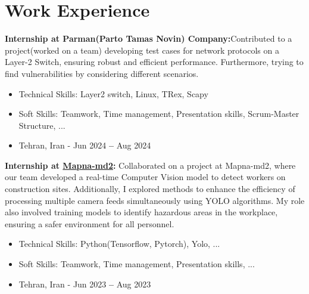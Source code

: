 \documentclass[letterpaper,11pt]{article}
\newcommand{\resumeSubHeadingListStart}{\begin{itemize}[leftmargin=0.15in, label={}]}
\newcommand{\resumeSubHeadingListEnd}{\end{itemize}}
\newcommand{\resumeItemListEnd}{\end{itemize}\vspace{-5pt}}
\begin{document}
	\section{Work Experience}
	\vspace{3pt}
	\resumeSubHeadingListStart
	\small{\item{

            \textbf{Internship at Parman(Parto Tamas Novin) Company:}{Contributed to a project(worked on a team) developing test cases for network protocols on a Layer-2 Switch, ensuring robust and efficient performance. Furthermore, trying to find vulnerabilities by considering different scenarios.}

            \begin{itemize}
                \item Technical Skills: Layer2 switch, Linux, TRex, Scapy
                \item Soft Skills: Teamwork, Time management, Presentation skills, Scrum-Master Structure, ...
                \item Tehran, Iran - Jun 2024 \textbf{--} Aug 2024
            \end{itemize}
            
		\textbf{Internship at {\href{https://www.mapnamd2.com/en/}{Mapna-md2}}: }{
            Collaborated on a project at Mapna-md2, where our team developed a real-time Computer Vision model to detect workers on construction sites. Additionally, I explored methods to enhance the efficiency of processing multiple camera feeds simultaneously using YOLO algorithms. My role also involved training models to identify hazardous areas in the workplace, ensuring a safer environment for all personnel.}
            \begin{itemize}
                \item Technical Skills: Python(Tensorflow, Pytorch), Yolo, ...
                \item Soft Skills: Teamwork, Time management, Presentation skills, ...
                \item Tehran, Iran - Jun 2023 \textbf{--} Aug 2023
            \end{itemize}



            

	}}
	\resumeSubHeadingListEnd
\end{document}

